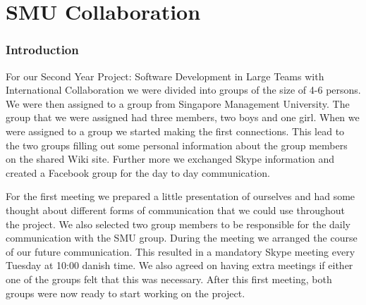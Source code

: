 \part{SMU Collaboration}
\section{Introduction}
For our Second Year Project: Software Development in Large Teams with International Collaboration we were divided into groups of the size of 4-6 persons. We were then assigned to a group from Singapore Management University. The group that we were assigned had three members, two boys and one girl.
When we were assigned to a group we started making the first connections. This lead to the two groups filling out some personal information about the group members on the shared Wiki site. Further more we exchanged Skype information and created a Facebook group for the day to day communication.

For the first meeting we prepared a little presentation of ourselves and had some thought about different forms of communication that we could use throughout the project. We also selected two group members to be responsible for the daily communication with the SMU group. 
During the meeting we arranged the course of our future communication. This resulted in a mandatory Skype meeting every Tuesday at 10:00 danish time.
We also agreed on having extra meetings if either one of the groups felt that this was necessary. After this first meeting, both groups were now ready to start working on the project.

